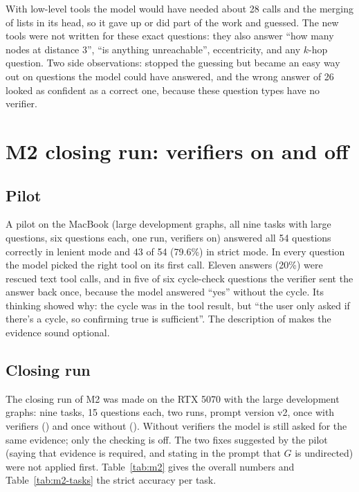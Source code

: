 With low-level tools the model would have needed about 28 calls and the merging of lists in its head, so it gave up
or did part of the work and guessed. The new tools were not written for these exact questions: they also answer ``how
many nodes at distance 3'', ``is anything unreachable'', eccentricity, and any $k$-hop question. Two side observations:
 stopped the guessing but became an easy way out on questions the model could have answered, and
the wrong answer of 26 looked as confident as a correct one, because these question types have no verifier.

\section{M2 closing run: verifiers on and off}

\subsection{Pilot}

A pilot on the MacBook (large development graphs, all nine tasks with large questions, six questions each, one run,
verifiers on) answered all 54 questions correctly in lenient mode and 43 of 54 (79.6\%) in strict mode. In every
question the model picked the right tool on its first call. Eleven answers (20\%) were rescued text tool calls, and in
five of six cycle-check questions the verifier sent the answer back once, because the model answered ``yes'' without
the cycle. Its thinking showed why: the cycle was in the tool result, but ``the user only asked if there's a cycle, so
confirming true is sufficient''. The description of  makes the evidence sound optional.

\subsection{Closing run}

The closing run of M2 was made on the RTX 5070 with the large development graphs: nine tasks, 15 questions each, two
runs, prompt version v2, once with verifiers () and once without ().
Without verifiers the model is still asked for the same evidence; only the checking is off. The two fixes suggested by
the pilot (saying that evidence is required, and stating in the prompt that $G$ is undirected) were not applied first.
Table~\ref{tab:m2} gives the overall numbers and Table~\ref{tab:m2-tasks} the strict accuracy per task.


